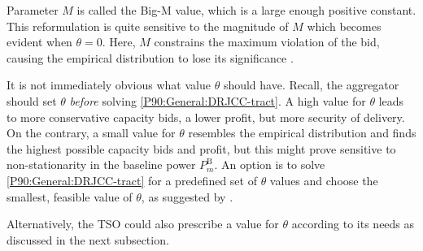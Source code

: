 \documentclass[conference]{IEEEtran}
\begin{document}
Parameter $M$ is called the Big-M value, which is a large enough positive constant. This reformulation is quite sensitive to the magnitude of $M$ which becomes evident when $\theta\!=\!0$. Here, $M$ constrains the maximum violation of the bid, causing the empirical distribution to lose its significance \cite[Theorem 2, Remark 1]{chen2022data}.

It is not immediately obvious what value $\theta$ should have. Recall, the aggregator should set $\theta$ \textit{before} solving \eqref{P90:General:DRJCC-tract}. A high value for $\theta$ leads to more conservative capacity bids, a lower profit, but more security of delivery. On the contrary, a small value for $\theta$ resembles the empirical distribution and finds the highest possible capacity bids and profit, but this might prove sensitive to non-stationarity in the baseline power $P_{m}^{\text{B}}$. An option is to solve \eqref{P90:General:DRJCC-tract} for a predefined set of $\theta$ values and choose the smallest, feasible value of $\theta$, as suggested by \cite[Section 3.2]{chen2022data}.

Alternatively, the \ac{TSO} could also prescribe a value for $\theta$ according to its needs as discussed in the next subsection.

\vspace{2mm}
\end{document}

